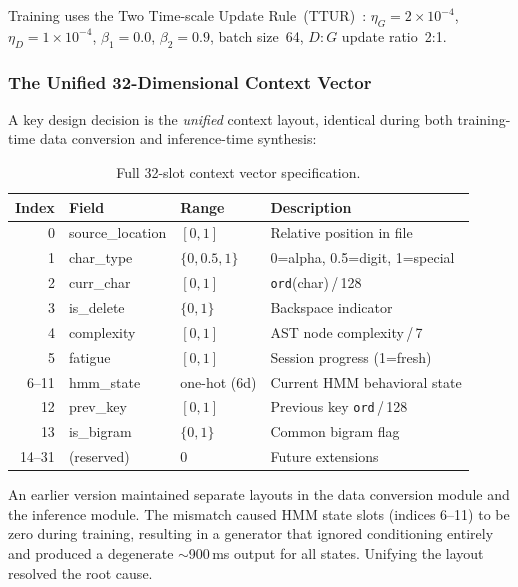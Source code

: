 \documentclass[sigconf,nonacm]{acmart}
\begin{document}
Training uses the Two Time-scale Update Rule~(TTUR)~\cite{heusel2017ttur}:
$\eta_G = 2 \times 10^{-4}$, $\eta_D = 1 \times 10^{-4}$,
$\beta_1 = 0.0$, $\beta_2 = 0.9$, batch size~64, $D:G$ update ratio~2:1.

\subsubsection{The Unified 32-Dimensional Context Vector}
\label{sec:ctx}

A key design decision is the \emph{unified} context layout, identical during both
training-time data conversion and inference-time synthesis:

\begin{table}[t]
\centering
\caption{Full 32-slot context vector specification.}
\begin{tabular}{rllp{7cm}}
\toprule
Index & Field & Range & Description \\
\midrule
0  & source\_location & $[0,1]$         & Relative position in file \\
1  & char\_type       & $\{0, 0.5, 1\}$ & 0=alpha, 0.5=digit, 1=special \\
2  & curr\_char       & $[0,1]$         & \texttt{ord}(char)\,/\,128 \\
3  & is\_delete       & $\{0,1\}$       & Backspace indicator \\
4  & complexity       & $[0,1]$         & AST node complexity\,/\,7 \\
5  & fatigue          & $[0,1]$         & Session progress (1=fresh) \\
6--11 & hmm\_state    & one-hot (6d)    & Current HMM behavioral state \\
12 & prev\_key        & $[0,1]$         & Previous key \texttt{ord}\,/\,128 \\
13 & is\_bigram       & $\{0,1\}$       & Common bigram flag \\
14--31 & (reserved)   & 0               & Future extensions \\
\bottomrule
\end{tabular}
\label{tab:ctx}
\end{table}

An earlier version maintained separate layouts in the data conversion module and the
inference module. The mismatch caused HMM state slots (indices 6--11) to be zero during
training, resulting in a generator that ignored conditioning entirely and produced a
degenerate $\sim$900\,ms output for all states. Unifying the layout resolved the root cause.
\end{document}
